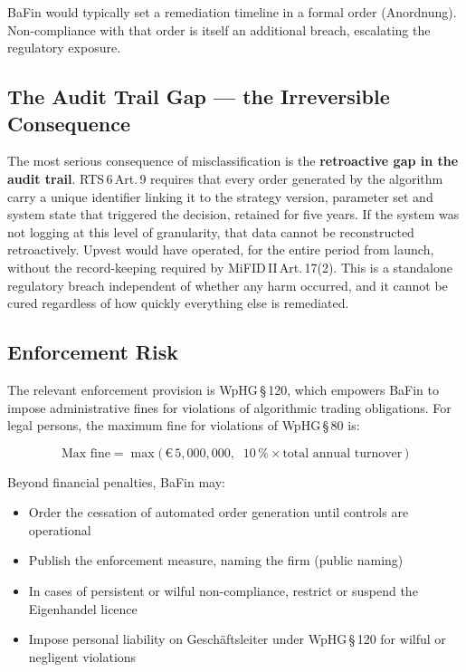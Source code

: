 \documentclass[12pt,a4paper]{report}
\newcommand{\eur}{\euro\,}
\begin{document}
BaFin would typically set a remediation timeline in a formal order (Anordnung).
Non-compliance with that order is itself an additional breach, escalating the regulatory
exposure.

\subsection{The Audit Trail Gap --- the Irreversible Consequence}

The most serious consequence of misclassification is the \textbf{retroactive gap in the
audit trail}. RTS\,6\,Art.\,9 requires that every order generated by the algorithm carry
a unique identifier linking it to the strategy version, parameter set and system state
that triggered the decision, retained for five years. If the system was not logging at
this level of granularity, that data cannot be reconstructed retroactively. Upvest would
have operated, for the entire period from launch, without the record-keeping required by
MiFID\,II\,Art.\,17(2). This is a standalone regulatory breach independent of whether
any harm occurred, and it cannot be cured regardless of how quickly everything else is
remediated.

\subsection{Enforcement Risk}

The relevant enforcement provision is WpHG\,\S\,120, which empowers BaFin to impose
administrative fines for violations of algorithmic trading obligations. For legal persons,
the maximum fine for violations of WpHG\,\S\,80 is:

\begin{equation}
  \text{Max fine} = \max\!\bigl(\,\eur{}5{,}000{,}000,\;\;10\,\% \times \text{total annual turnover}\,\bigr)
  \label{eq:fine}
\end{equation}

Beyond financial penalties, BaFin may:
\begin{itemize}
  \item Order the cessation of automated order generation until controls are operational
  \item Publish the enforcement measure, naming the firm (public naming)
  \item In cases of persistent or wilful non-compliance, restrict or suspend the
        Eigenhandel licence
  \item Impose personal liability on Gesch{\"a}ftsleiter under WpHG\,\S\,120
        for wilful or negligent violations
\end{itemize}
\end{document}
